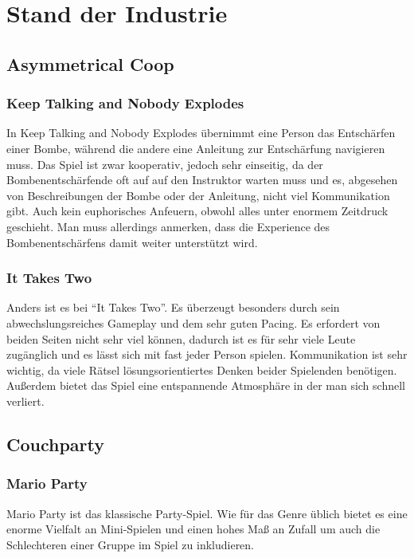 \chapter{Stand der Industrie\label{_industrie}}

\section{Asymmetrical Coop}

\subsection{Keep Talking and Nobody Explodes}
In Keep Talking and Nobody Explodes übernimmt eine Person das Entschärfen einer Bombe, während die andere eine Anleitung zur Entschärfung navigieren muss. Das Spiel ist zwar kooperativ, jedoch sehr einseitig, da der Bombenentschärfende oft auf auf den Instruktor warten muss und es, abgesehen von Beschreibungen der Bombe oder der Anleitung, nicht viel Kommunikation gibt. Auch kein euphorisches Anfeuern, obwohl alles unter enormem Zeitdruck geschieht. Man muss allerdings anmerken, dass die Experience des Bombenentschärfens damit weiter unterstützt wird.

\subsection{It Takes Two}
Anders ist es bei "`It Takes Two"'. Es überzeugt besonders durch sein abwechslungsreiches Gameplay und dem sehr guten Pacing. Es erfordert von beiden Seiten nicht sehr viel können, dadurch ist es für sehr viele Leute zugänglich und es lässt sich mit fast jeder Person spielen. Kommunikation ist sehr wichtig, da viele Rätsel lösungsorientiertes Denken beider Spielenden benötigen. Außerdem bietet das Spiel eine entspannende Atmosphäre in der man sich schnell verliert.

\section{Couchparty}

\subsection{Mario Party}
Mario Party ist das klassische Party-Spiel. Wie für das Genre üblich bietet es eine enorme Vielfalt an Mini-Spielen und einen hohes Maß an Zufall um auch die Schlechteren einer Gruppe im Spiel zu inkludieren.

